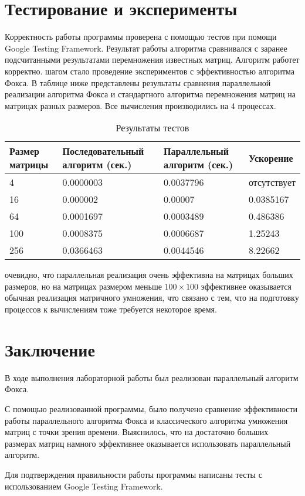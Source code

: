 \documentclass{report}
\begin{document}
\section*{Тестирование и эксперименты}
Корректность работы программы проверена с помощью тестов при помощи Google Testing Framework. Результат работы алгоритма сравнивался с заранее подсчитанными результатами перемножения известных матриц. Алгоритм работет корректно.
 шагом стало проведение экспериментов с эффективностью алгоритма Фокса. В таблице ниже представлены результаты сравнения параллельной реализации алгоритма Фокса и стандартного алгоритма перемножения матриц на матрицах разных размеров. Все вычисления производились на 4 процессах.

\begin{table}[!h]
    \centering
    \begin{tabular}{ | l | l | l | l |}
    \hline
    \scriptsize{Размер матрицы} & \scriptsize{Последовательный алгоритм (сек.)} & \scriptsize{Параллельный алгоритм (сек.)} & \scriptsize{Ускорение}  \\ \hline
    4   &   0.0000003    &   0.0037796    &   отсутствует \\ \hline
    16   &   0.000002    &   0.00007    &   0.0385167  \\ \hline
    64   &   0.0001697    &   0.0003489    &   0.486386  \\ \hline
    100   &   0.0008375    &   0.0006687    &   1.25243  \\ \hline
    256   &   0.0366463    &   0.0044546    &   8.22662  \\ \hline
    \end{tabular}
    \caption{Результаты тестов}
    \end{table}
    
 очевидно, что параллельная реализация очень эффективна на матрицах больших размеров, но на матрицах размером меньше {\itshape $100 \times 100$} эффективнее оказывается обычная реализация матричного умножения, что связано с тем, что на подготовку процессов к вычислениям тоже требуется некоторое время.
\newpage

\section*{Заключение}
В ходе выполнения лабораторной работы был реализован параллельный алгоритм Фокса.
\par С помощью реализованной программы, было получено сравнение эффективности работы параллельного алгоритма Фокса и классического алгоритма умножения матриц с точки зрения времени. Выяснилось, что на достаточно больших размерах матриц намного эффективнее оказывается использовать параллельный алгоритм. 
\par Для подтверждения правильности работы программы написаны тесты с использованием Google Testing Framework.
\newpage
\end{document}
